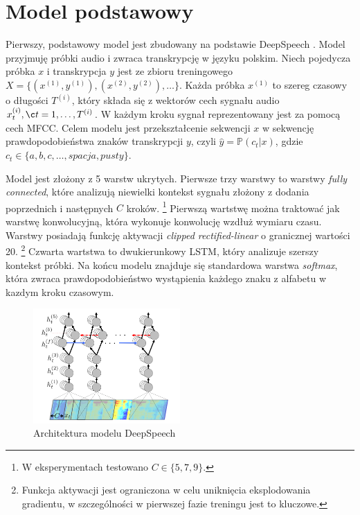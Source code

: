 
\section{Model podstawowy}

Pierwszy, podstawowy model jest zbudowany na podstawie DeepSpeech \cite{deepspeech}.
Model przyjmuję próbki audio i zwraca transkrypcję w języku polskim.
Niech pojedycza próbka $x$ i transkrypcja $y$ jest ze zbioru treningowego
$X = \{(x^{(1)}, y^{(1)}), (x^{(2)}, y^{(2)}), \dots\}$.
Każda próbka $x^{(1)}$ to szereg czasowy o długości $T^{(i)}$,
który składa się z wektorów cech sygnału audio $x_t^{(i)}, \c t=1,\dots,T^{(i)}$.
W każdym kroku sygnał reprezentowany jest za pomocą cech MFCC.
Celem modelu jest przekształcenie sekwencji $x$ w sekwencję prawdopodobieństwa znaków transkrypcji $y$,
czyli $\hat{y} = \mathbb{P}(c_t | x)$, gdzie $c_t \in \{ a, b, c, \dots, \textit{spacja}, \textit{pusty} \}$.

Model jest złożony z 5 warstw ukrytych.
Pierwsze trzy warstwy to warstwy \textit{fully connected}, które
analizują niewielki kontekst sygnału złożony z dodania poprzednich i następnych $C$ kroków.
\footnote{W eksperymentach testowano $C \in \{5,7,9\}$.}
Pierwszą wartstwę można traktować jak warstwę konwolucyjną, która wykonuje konwolucję wzdłuż wymiaru czasu.
Warstwy posiadają funkcję aktywacji \textit{clipped rectified-linear} o granicznej wartości 20.
\footnote{Funkcja aktywacji jest ograniczona w celu uniknięcia eksplodowania gradientu,
w szczególności w pierwszej fazie treningu jest to kluczowe.}
Czwarta wartstwa to dwukierunkowy LSTM, który analizuje szerszy kontekst próbki.
Na końcu modelu znajduje się standardowa warstwa \textit{softmax},
która zwraca prawdopodobieństwo wystąpienia każdego znaku z alfabetu w kazdym kroku czasowym.

\begin{figure}
    \centering
    \includegraphics[width=0.5\textwidth]{images/deepspeech.png}
    \caption{Architektura modelu DeepSpeech \cite{deepspeech}}
    \label{fig:deepspeech}
\end{figure}



